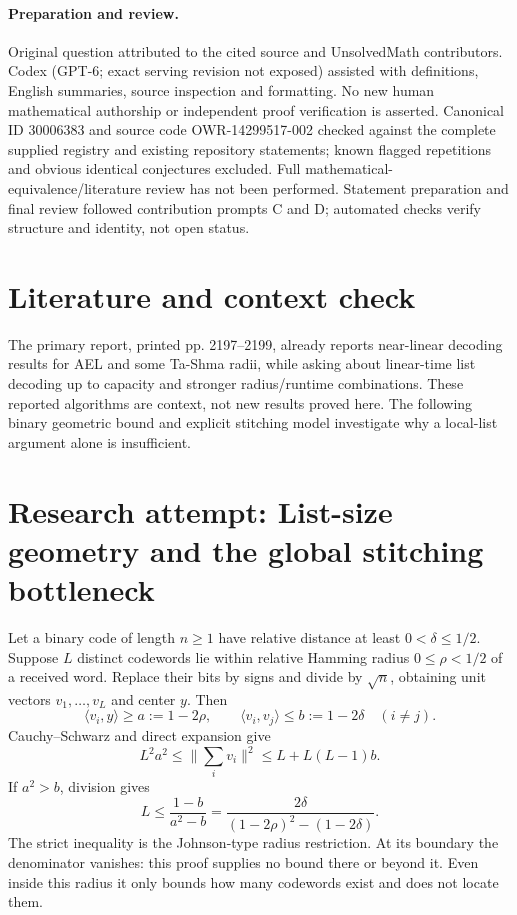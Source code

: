 \documentclass[11pt]{article}
\begin{document}
\paragraph{Preparation and review.}
Original question attributed to the cited source and UnsolvedMath contributors. Codex (GPT-6; exact serving revision not exposed) assisted with definitions, English summaries, source inspection and formatting. No new human mathematical authorship or independent proof verification is asserted. Canonical ID 30006383 and source code OWR-14299517-002 checked against the complete supplied registry and existing repository statements; known flagged repetitions and obvious identical conjectures excluded. Full mathematical-equivalence/literature review has not been performed. Statement preparation and final review followed contribution prompts C and D; automated checks verify structure and identity, not open status.
\label{end:30006383}

\section{Literature and context check}
The primary report, printed pp. 2197--2199, already reports near-linear decoding results for AEL and some Ta-Shma radii, while asking about linear-time list decoding up to capacity and stronger radius/runtime combinations. These reported algorithms are context, not new results proved here. The following binary geometric bound and explicit stitching model investigate why a local-list argument alone is insufficient.
\section{Research attempt: List-size geometry and the global stitching bottleneck}

Let a binary code of length $n\geq1$ have relative distance at least $0<\delta\leq1/2$. Suppose $L$ distinct codewords lie within relative Hamming radius $0\leq\rho<1/2$ of a received word. Replace their bits by signs and divide by $\sqrt n$, obtaining unit vectors $v_1,\ldots,v_L$ and center $y$. Then
\[
\langle v_i,y\rangle\geq a:=1-2\rho,
\qquad \langle v_i,v_j\rangle\leq b:=1-2\delta\quad(i\ne j).
\]
Cauchy--Schwarz and direct expansion give
\[
L^2a^2\leq\Big\|\sum_i v_i\Big\|^2
\leq L+L(L-1)b.
\]
If $a^2>b$, division gives
\[
L\leq\frac{1-b}{a^2-b}=\frac{2\delta}{(1-2\rho)^2-(1-2\delta)}.
\]
The strict inequality is the Johnson-type radius restriction. At its boundary the denominator vanishes: this proof supplies no bound there or beyond it. Even inside this radius it only bounds how many codewords exist and does not locate them.
\end{document}

